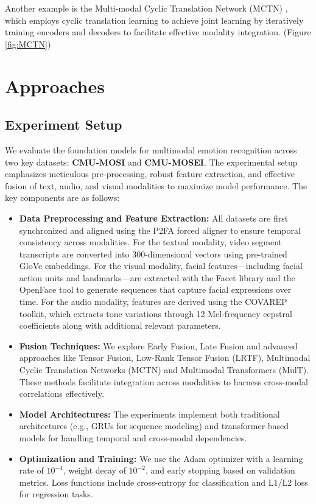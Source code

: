 \documentclass{article}
\begin{document}
Another example is the Multi-modal Cyclic Translation Network (MCTN) \cite{Pham2019MCTN}, which employs cyclic translation learning to achieve joint learning by iteratively training encoders and decoders to facilitate effective modality integration. (Figure \ref{fig:MCTN})


\section{Approaches}

\subsection{Experiment Setup}
We evaluate the foundation models for multimodal emotion recognition across two key datasets: \textbf{CMU-MOSI} and \textbf{CMU-MOSEI}. The experimental setup emphasizes meticulous pre-processing, robust feature extraction, and effective fusion of text, audio, and visual modalities to maximize model performance. The key components are as follows:

\begin{itemize} 
\item \textbf{Data Preprocessing and Feature Extraction:}
All datasets are first synchronized and aligned using the P2FA forced aligner to ensure temporal consistency across modalities. For the textual modality, video segment transcripts are converted into 300-dimensional vectors using pre-trained GloVe embeddings. For the visual modality, facial features—including facial action units and landmarks—are extracted with the Facet library and the OpenFace tool to generate sequences that capture facial expressions over time. For the audio modality, features are derived using the COVAREP toolkit, which extracts tone variations through 12 Mel-frequency cepstral coefficients along with additional relevant parameters.

    \item \textbf{Fusion Techniques:} We explore Early Fusion, Late Fusion and advanced approaches like Tensor Fusion, Low-Rank Tensor Fusion (LRTF), Multimodal Cyclic Translation Networks (MCTN) and Multimodal Transformers (MulT). These methods facilitate integration across modalities to harness cross-modal correlations effectively.
    \item \textbf{Model Architectures:} The experiments implement both traditional architectures (e.g., GRUs for sequence modeling) and transformer-based models for handling temporal and cross-modal dependencies.
    \item \textbf{Optimization and Training:} We use the Adam optimizer with a learning rate of \(10^{-4}\), weight decay of \(10^{-2}\), and early stopping based on validation metrics. Loss functions include cross-entropy for classification and L1/L2 loss for regression tasks.
\end{itemize}
\end{document}
